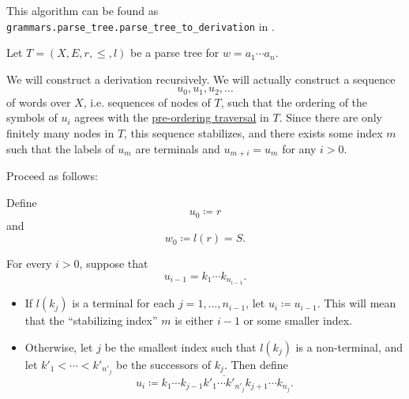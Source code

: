 \begin{comments}
  \item This algorithm can be found as \texttt{grammars.parse\_tree.parse\_tree\_to\_derivation} in \cite{code}.
\end{comments}

\begin{algorithm}\label{alg:leftmost_derivation_from_parse_tree}
  Let \( T = (X, E, r, \leq, l) \) be a parse tree for \( w = a_1 \cdots a_n \).

  We will construct a derivation recursively. We will actually construct a sequence
  \begin{equation*}
    u_0, u_1, u_2, \ldots
  \end{equation*}
  of words over \( X \), i.e. sequences of nodes of \( T \), such that the ordering of the symbols of \( u_i \) agrees with the \hyperref[def:traversal_ordering]{pre-ordering traversal} in \( T \). Since there are only finitely many nodes in \( T \), this sequence stabilizes, and there exists some index \( m \) such that the labels of \( u_m \) are terminals and \( u_{m+i} = u_m \) for any \( i > 0 \).

  Proceed as follows:
  \begin{thmenum}
     Define
    \begin{equation*}
      u_0 \coloneqq r
    \end{equation*}
    and
    \begin{equation*}
      w_0 \coloneqq l(r) = S.
    \end{equation*}

     For every \( i > 0 \), suppose that
    \begin{equation*}
      u_{i-1} = k_1 \cdots k_{n_{i-1}}.
    \end{equation*}

    \begin{itemize}
      \item If \( l(k_j) \) is a terminal for each \( j = 1, \ldots, n_{i-1} \), let \( u_i \coloneqq u_{i-1} \). This will mean that the \enquote{stabilizing index} \( m \) is either \( i - 1 \) or some smaller index.

      \item Otherwise, let \( j \) be the smallest index such that \( l(k_j) \) is a non-terminal, and let \( k'_1 < \cdots < k'_{n'_j} \) be the successors of \( k_j \). Then define
      \begin{equation*}
        u_i \coloneqq k_1 \cdots k_{j-1} \overline{ k'_1 \cdots k'_{n'_j} } k_{j+1} \cdots k_{n_j}.
      \end{equation*}


\end{itemize}
\end{thmenum}
\end{algorithm}

